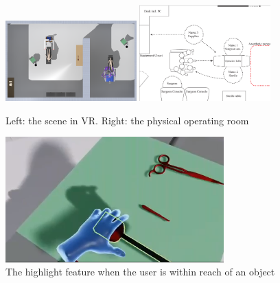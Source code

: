\begin{figure}
\centering
\includegraphics[width=0.45\textwidth]{FinishedSystem/SceneTop}
\includegraphics[width=0.45\textwidth]{FinishedSystem/overview_rotated}
\caption{Left: the scene in VR. Right: the physical operating room}
\label{Fig:SceneTop}
\end{figure}

\begin{figure}
\centering
\includegraphics[width=0.75\textwidth]{FinishedSystem/grab}
\caption{The highlight feature when the user is within reach of an object}
\label{Fig:Grabering}
\end{figure}

